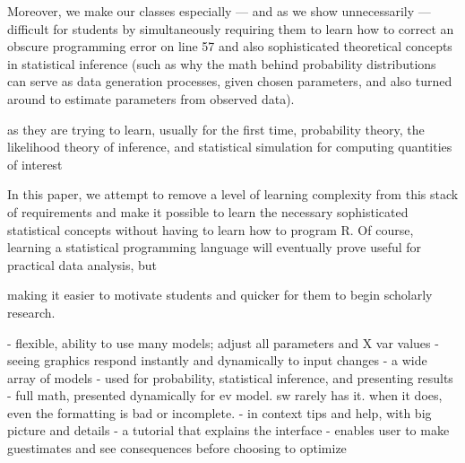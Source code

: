 \documentclass[12pt]{article}
\theoremstyle{definition}
\begin{document}
Moreover, we make our classes especially --- and as we show unnecessarily --- difficult for students by simultaneously requiring them to learn how to correct an obscure programming error on line 57 and also sophisticated theoretical concepts in statistical inference (such as why the math behind probability distributions can serve as data generation processes, given chosen parameters, and also turned around to estimate parameters from observed data).

as they are trying to learn, usually for the first time, probability theory, the likelihood theory of inference, and statistical simulation for computing quantities of interest

In this paper, we attempt to remove a level of learning complexity from this stack of requirements and make it possible to learn the necessary sophisticated statistical concepts without having to learn how to program R.  Of course, learning a statistical programming language will eventually prove useful for practical data analysis, but 

making it easier to motivate students and quicker for them to begin scholarly research.  


- flexible, ability to use many models; adjust all parameters and X var values
- seeing graphics respond instantly and dynamically to input changes
- a wide array of models
- used for probability, statistical inference, and presenting results
- full math, presented dynamically for ev model.  sw rarely has it. when it does, even the formatting is bad or incomplete.
- in context tips and help, with big picture and details
- a tutorial that explains the interface
- enables user to make guestimates and see consequences before choosing to optimize




\singlespace
\printbibliography
\end{document}
